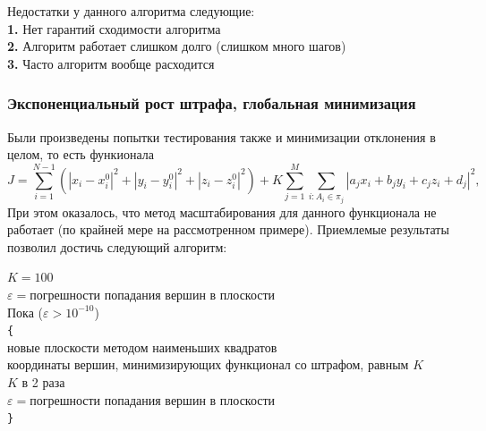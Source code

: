 \documentclass[a4paper,12pt, titlepage]{article}
\begin{document}
\begin{flushleft}
Недостатки у данного алгоритма следующие:\\
 	\textbf{1. }Нет гарантий сходимости алгоритма\\
	\textbf{2. }Алгоритм работает слишком долго (слишком много шагов)\\
	\textbf{3. }Часто алгоритм вообще расходится\\
\end{flushleft}

\subsubsection{Экспоненциальный рост штрафа, глобальная минимизация}
\begin{flushleft}
  Были произведены попытки тестирования также и минимизации отклонения в целом, то есть функионала
$$
	J = \sum\limits_{i = 1}^{N - 1}(|x_{i} - x_{i}^{0}|^{2} + |y_{i} - y_{i}^{0}|^{2} 
	+ |z_{i} - z_{i}^{0}|^{2}) + 
	K\sum\limits_{j = 1}^{M}\sum\limits_{i: A_{i} \in \pi_{j}}
	|a_{j}x_{i} + b_{j}y_{i} + c_{j}z_{i} + d_{j}|^{2},
$$
При этом оказалось, что метод масштабирования для данного функционала не работает (по крайней мере на
рассмотренном примере). Приемлемые результаты позволил достичь следующий алгоритм:
\end{flushleft}

\begin{flushleft}
$K = 100$\\
$\varepsilon = $погрешности попадания вершин в плоскости\\
Пока ($\varepsilon > 10^{-10}$)\\
\verb"{"\\
 новые плоскости методом наименьших квадратов\\
 координаты вершин, минимизирующих функционал со штрафом, равным $K$\\
 $K$ в 2 раза\\
\quad$\varepsilon = $погрешности попадания вершин в плоскости\\
\verb"}"\\
\end{flushleft}
\end{document}
